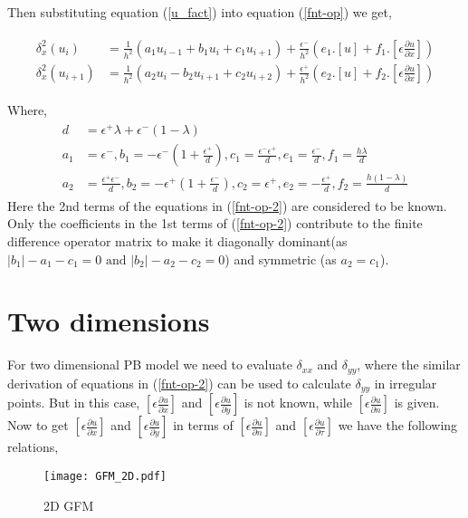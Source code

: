 Then substituting equation (\ref{u_fact}) into equation (\ref{fnt-op}) we get, 

\begin{eqnarray}
	\begin{aligned}
		\delta_x^2\left(u_{i}\right)&= \frac{1}{h^2} \left(a_1u_{i-1}+b_1 u_{i}+c_1u_{i+1}\right)+\frac{\epsilon^-}{h^2}\left(e_1.[u]+f_1.\left[ \epsilon \frac{\partial u}{\partial x} \right]\right)\\
		\delta_x^2\left(u_{i+1}\right)&= \frac{1}{h^2} \left(a_2u_{i}-b_2u_{i+1}+c_2u_{i+2}\right)+\frac{\epsilon^+}{h^2}\left(e_2.[u]+f_2.\left[ \epsilon \frac{\partial u}{\partial x} \right]\right)
	\end{aligned}\label{fnt-op-2}
\end{eqnarray}
 
Where,
\begin{eqnarray}
\begin{aligned}
d&=\epsilon^+\lambda+\epsilon^-(1-\lambda)\\
a_1&= \epsilon^-,b_1=-\epsilon^-\left(1+\frac{\epsilon^+}{d}\right), c_1=\frac{\epsilon^-\epsilon^+}{d}, e_1=\frac{\epsilon^-}{d},f_1=\frac{h\lambda}{d}\\
a_2&= \frac{\epsilon^+\epsilon^-}{d},b_2=-\epsilon^+\left(1+\frac{\epsilon^-}{d}\right), c_2=\epsilon^+, e_2=-\frac{\epsilon^+}{d},f_2=\frac{h(1-\lambda)}{d}
\end{aligned}
\end{eqnarray}
Here the 2nd terms of the equations in (\ref{fnt-op-2}) are considered to be known. Only the coefficients in the 1st terms of (\ref{fnt-op-2})  contribute to the finite difference operator matrix to make it diagonally dominant(as $|b_1|-a_1-c_1=0\text{ and } |b_2|-a_2-c_2=0$) and symmetric (as $a_2=c_1$).    
\section{Two dimensions}
For two dimensional PB model we need to evaluate $\delta_{xx}$ and $\delta_{yy}$, where the similar derivation of equations in (\ref{fnt-op-2}) can be used to calculate $\delta_{yy}$ in irregular points. But in this case,  $\left[ \epsilon \frac{\partial u}{\partial x} \right]$ and $\left[ \epsilon \frac{\partial u}{\partial y} \right]$ is not known, while $\left[ \epsilon \frac{\partial u}{\partial n} \right]$ is given. Now to get $\left[ \epsilon \frac{\partial u}{\partial x} \right]$ and $\left[ \epsilon \frac{\partial u}{\partial y} \right]$ in terms of $\left[ \epsilon \frac{\partial u}{\partial n} \right]$ and $\left[ \epsilon \frac{\partial u}{\partial \tau} \right]$ we have the following relations,  
\begin{figure}[ht]
\begin{center}
\texttt{[image: GFM\_2D.pdf]}
\caption{2D GFM}
\label{fig_gfm_2D}
\end{center}
\end{figure}

